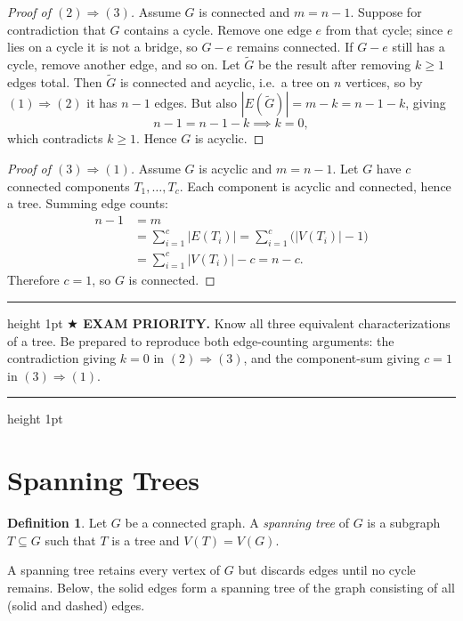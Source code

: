 \documentclass[11pt]{article}
\theoremstyle{definition}
\newtheorem*{definition*}{Definition}
\newenvironment{exambox}
  {\par\medskip\noindent\begin{center}\begin{minipage}{0.92\textwidth}%
   \hrule height 1pt \vspace{4pt}\noindent\textbf{$\bigstar$ EXAM PRIORITY.} }
  {\vspace{4pt}\hrule height 1pt \end{minipage}\end{center}\medskip}
\begin{document}
\begin{proof}[Proof of $(2)\Rightarrow(3)$]
Assume $G$ is connected and $m=n-1$.  Suppose for contradiction that $G$
contains a cycle.  Remove one edge $e$ from that cycle; since $e$ lies on
a cycle it is not a bridge, so $G-e$ remains connected.  If $G-e$ still
has a cycle, remove another edge, and so on.  Let $\widetilde{G}$ be the
result after removing $k\geq 1$ edges total.  Then $\widetilde{G}$ is
connected and acyclic, i.e.\ a tree on $n$ vertices, so by
$(1)\Rightarrow(2)$ it has $n-1$ edges.  But also
$|E(\widetilde{G})|=m-k=n-1-k$, giving
\[
  n-1 = n-1-k \implies k=0,
\]
which contradicts $k\geq 1$.  Hence $G$ is acyclic.
\end{proof}

\begin{proof}[Proof of $(3)\Rightarrow(1)$]
Assume $G$ is acyclic and $m=n-1$.  Let $G$ have $c$ connected components
$T_1,\ldots,T_c$.  Each component is acyclic and connected, hence a tree.
Summing edge counts:
\begin{align*}
  n-1 &= m \\
      &= \sum_{i=1}^{c}|E(T_i)|
       = \sum_{i=1}^{c}\bigl(|V(T_i)|-1\bigr) \\
      &= \sum_{i=1}^{c}|V(T_i)| - c = n-c.
\end{align*}
Therefore $c=1$, so $G$ is connected.
\end{proof}

\begin{exambox}
Know all three equivalent characterizations of a tree.  Be prepared to
reproduce both edge-counting arguments: the contradiction giving $k=0$ in
$(2)\Rightarrow(3)$, and the component-sum giving $c=1$ in
$(3)\Rightarrow(1)$.
\end{exambox}

\section*{Spanning Trees}

\begin{definition*}
Let $G$ be a connected graph.  A \emph{spanning tree} of $G$ is a subgraph
$T\subseteq G$ such that $T$ is a tree and $V(T)=V(G)$.
\end{definition*}

A spanning tree retains every vertex of $G$ but discards edges until no
cycle remains.  Below, the solid edges form a spanning tree of the graph
consisting of all (solid and dashed) edges.
\end{document}
